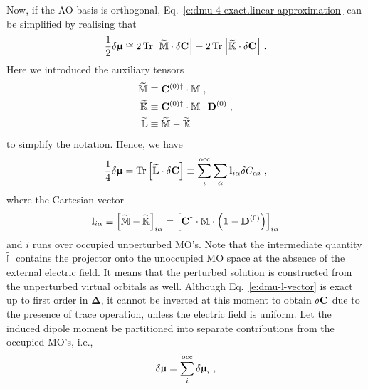 \documentclass[aip,amsmath,amssymb,reprint,floatfix]{revtex4-1}
\newcommand{\BM}[1]{\bm{#1}}
\DeclareMathOperator{\Tr}{Tr}
\begin{document}
Now, if the AO basis is orthogonal, Eq.~\eqref{e:dmu-4-exact.linear-approximation} can be simplified by realising that
%
\begin{equation}
 \frac{1}{2} 
 \delta {\BM{\upmu}}
  \cong
2 \Tr{ 
    \left[ 
         \widetilde{\mathbb{M}} \cdot \delta {\bf C}
   \right] }  
-
2 \Tr{ 
    \left[ 
         \widetilde{\mathbb{K}} \cdot \delta {\bf C}
   \right] } \;.
\end{equation}
%
Here we introduced the auxiliary tensors
%
\begin{subequations}
 \begin{align}
   \widetilde{\mathbb{M}}  &\equiv {\bf C}^{(0)\dagger} \cdot {\mathbb{M}}     \;,           \\
   \widetilde{\mathbb{K}}  &\equiv {\bf C}^{(0)\dagger} \cdot {\mathbb{M}} \cdot {\bf D}^{(0)} \;, \\
   \widetilde{\mathbb{L}}  &\equiv \widetilde{\mathbb{M}} - \widetilde{\mathbb{K}} \;
 \end{align}
\end{subequations}
%
to simplify the notation. Hence, we have
%
\begin{equation} \label{e:dmu-l-vector}
  \frac{1}{4} 
 \delta {\BM{\upmu}} %
   =
   \Tr{ 
    \left[ 
         \widetilde{\mathbb{L}} \cdot \delta {\bf C}
    \right] }
   \equiv \sum_{i}^{\rm occ} \sum_\alpha {\bf l}_{i\alpha} \delta C_{\alpha i} \;,
\end{equation}
%
where the Cartesian vector
%
\begin{equation}\label{e:l-vector}
 {\bf l}_{i\alpha} \equiv \left[ \widetilde{\mathbb{M}} - \widetilde{\mathbb{K}} \right]_{i\alpha} 
      = \left[  {\bf C}^\dagger \cdot \mathbb{M} \cdot \left( {\bf 1} - {\bf D}^{(0)} \right) \right]_{i\alpha}
\end{equation}
%
and $i$ runs over occupied unperturbed MO's.
Note that the intermediate quantity $\widetilde{\mathbb{L}}$ contains the projector onto
the unoccupied MO space at the absence of the external electric field. It means that the
perturbed solution is constructed from the unperturbed virtual orbitals as well.
Although Eq.~\eqref{e:dmu-l-vector}
is exact up to first order in ${\BM\Delta}$, it cannot be inverted at this moment to obtain $\delta {\bf C}$
due to the presence of trace operation, unless the electric field is uniform.
Let the induced dipole moment be partitioned into separate contributions
from the occupied MO's, i.e.,
%
\begin{equation} \label{e:dmu-part}
 \delta {\BM{\upmu}} = \sum_i^{\rm occ} \delta {\BM{\upmu}}_i \;,
\end{equation}
\end{document}
